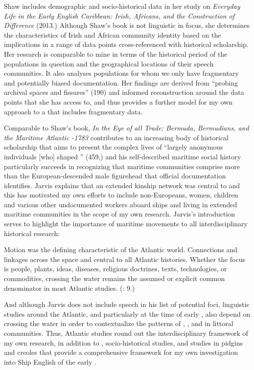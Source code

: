 Shaw includes demographic and socio-historical data in her study on \textit{Everyday Life in the Early English Caribbean: Irish, Africans, and the Construction of Difference} (2013.) Although Shaw’s book is not linguistic in focus, she determines the characteristics of Irish and African community identity based on the implications in a range of data points cross-referenced with historical scholarship. Her research is comparable to mine in terms of the historical period of the populations in question and the geographical locations of their speech communities. It also analyses populations for whom we only have fragmentary and potentially biased documentation. Her findings are derived from “probing archival spaces and fissures” (190) and informed reconstruction around the data points that she has access to, and thus provides a further model for my own approach to a  that includes fragmentary data. 

Comparable to Shaw’s book,  \textit{In the Eye of all Trade: Bermuda, Bermudians, and the Maritime Atlantic \citealt{World1680}-1783} contributes to an increasing body of historical scholarship that aims to present the complex lives of “largely anonymous individuals [who] shaped ” (459,) and his self-described maritime social history particularly succeeds in recognizing that maritime communities comprise more than the European-descended male figurehead that official documentation identifies. Jarvis explains that an extended kinship network was central to  and this has motivated my own efforts to include non-Europeans, women, children and various other undocumented workers aboard ships and living in extended maritime communities in the scope of my own research. Jarvis’s introduction serves to highlight the importance of maritime movements to all interdisciplinary historical research: 

Motion was the defining characteristic of the Atlantic world. Connections and linkages across the space and central to all Atlantic histories. Whether the focus is people, plants, ideas, diseases, religious doctrines, texts, technologies, or commodities, crossing the water remains the assumed or explicit common denominator in most Atlantic studies. (\citealt{Jarvis2010}: 9.)

And although Jarvis does not include speech in his list of potential foci, linguistic studies around the Atlantic, and particularly at the time of early , also depend on crossing the water in order to contextualize the patterns of ,  , and  in littoral communities. Thus, Atlantic studies round out the interdisciplinary framework of my own research, in addition to , socio-historical studies, and studies in pidgins and creoles that provide a comprehensive framework for my own investigation into Ship English of the early . 

